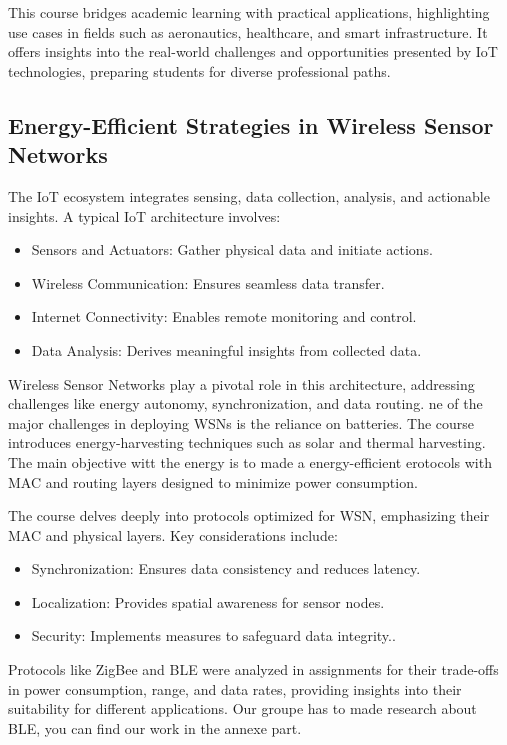 This course bridges academic learning with practical applications, highlighting use cases in fields such as aeronautics, healthcare, and smart infrastructure. It offers insights into the real-world challenges and opportunities presented by IoT technologies, preparing students for diverse professional paths.

\subsection{Energy-Efficient Strategies in Wireless Sensor Networks}

The IoT ecosystem integrates sensing, data collection, analysis, and actionable insights. A typical IoT architecture involves:

\begin{itemize}
    \item Sensors and Actuators: Gather physical data and initiate actions.
    \item Wireless Communication: Ensures seamless data transfer.
    \item Internet Connectivity: Enables remote monitoring and control.
    \item Data Analysis: Derives meaningful insights from collected data.
\end{itemize}

Wireless Sensor Networks play a pivotal role in this architecture, addressing challenges like energy autonomy, synchronization, and data routing.
ne of the major challenges in deploying WSNs is the reliance on batteries. The course introduces energy-harvesting techniques such as solar and thermal harvesting.
The main objective witt the energy is to made a energy-efficient erotocols with MAC and routing layers designed to minimize power consumption.

The course delves deeply into protocols optimized for WSN, emphasizing their MAC and physical layers. Key considerations include:

\begin{itemize}
    \item Synchronization: Ensures data consistency and reduces latency.
    \item Localization: Provides spatial awareness for sensor nodes.
    \item Security: Implements measures to safeguard data integrity..
\end{itemize}

Protocols like ZigBee and BLE were analyzed in assignments for their trade-offs in power consumption, range, and data rates, providing insights into their suitability for different applications.
Our groupe has to made research about BLE, you can find our work in the annexe part.

